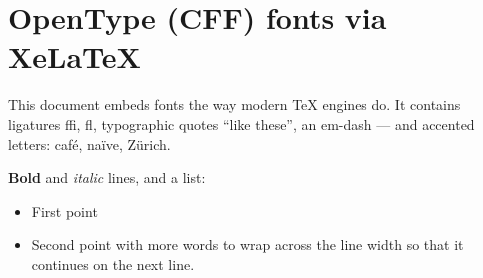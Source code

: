\documentclass{article}
\begin{document}
\section*{OpenType (CFF) fonts via XeLaTeX}
This document embeds fonts the way modern TeX engines do. It contains ligatures ffi, fl, typographic quotes “like these”, an em-dash — and accented letters: café, naïve, Zürich.

\textbf{Bold} and \textit{italic} lines, and a list:
\begin{itemize}\item First point\item Second point with more words to wrap across the line width so that it continues on the next line.\end{itemize}
\end{document}
